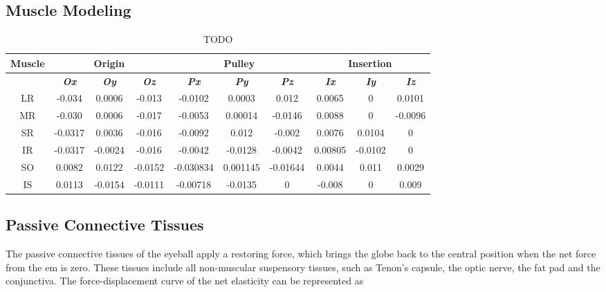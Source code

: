 \documentclass[11pt,a4paper,draft=false]{report}
\begin{document}
\subsection*{Muscle Modeling}\label{sec:muscle-modeling}

\begin{table}[h]
  \caption{TODO}\label{tab:muscle-path}
  \begin{tabular}{@{}cccccccccc@{}}
    \toprule
    \textbf{Muscle}
    & \multicolumn{3}{c}{\textbf{Origin}}
    & \multicolumn{3}{c}{\textbf{Pulley}}
    & \multicolumn{3}{c}{\textbf{Insertion}}
    \\ \midrule
    & \textit{\textbf{Ox}} & \textit{\textbf{Oy}} & \textit{\textbf{Oz}}
    & \textit{\textbf{Px}} & \textit{\textbf{Py}} & \textit{\textbf{Pz}}
    & \textit{\textbf{Ix}} & \textit{\textbf{Iy}} & \textit{\textbf{Iz}}
    \\ \midrule
    LR & -0.034 & 0.0006 & -0.013 & -0.0102 & 0.0003 & 0.012 & 0.0065 & 0 & 0.0101 \\
    MR & -0.030 & 0.0006 & -0.017 & -0.0053 & 0.00014 & -0.0146 & 0.0088 & 0 & -0.0096 \\
    SR & -0.0317 & 0.0036 & -0.016 & -0.0092 & 0.012 & -0.002 & 0.0076 & 0.0104 & 0 \\
    IR & -0.0317 & -0.0024 & -0.016 & -0.0042 & -0.0128 & -0.0042 & 0.00805 & -0.0102 & 0 \\
    SO & 0.0082 & 0.0122 & -0.0152 & -0.030834 & 0.001145 & -0.01644 & 0.0044 & 0.011 & 0.0029 \\
    IS & 0.0113 & -0.0154 & -0.0111 & -0.00718 & -0.0135 & 0 & -0.008 & 0 & 0.009 \\
    \bottomrule
  \end{tabular}
\end{table}

\subsection*{Passive Connective Tissues}\label{sec:passive-connective-tissues}

The passive connective tissues of the eyeball apply a restoring force, which
brings the globe back to the central position when the net force from the
\gls{em} is zero. These tissues include all non-muscular suspensory tissues,
such as Tenon’s capsule, the optic nerve, the fat pad and the conjunctiva. The
force-displacement curve of the net elasticity can be represented as
\end{document}
